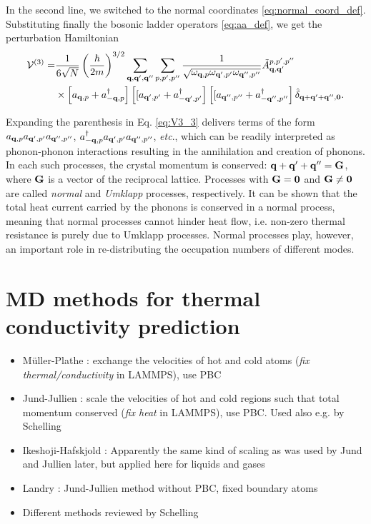 In the second line, we switched to the normal coordinates \eqref{eq:normal_coord_def}. Substituting finally the bosonic ladder operators \eqref{eq:aa_def}, we get the perturbation Hamiltonian
\begin{alignat}{2}
\mathcal{V}^{(3)} = & \frac{1}{6\sqrt{N}} \left(\frac{\hbar}{2m} \right)^{3/2} \sum_{\mathbf{q},\mathbf{q}',\mathbf{q}''} \sum_{p,p',p''} \frac{1}{\sqrt{\omega_{\mathbf{q},p}\omega_{\mathbf{q}',p'} \omega_{\mathbf{q}'',p''}}} \tilde{A}^{p,p',p''}_{\mathbf{q},\mathbf{q}'} \notag \\
  & \times \left[a_{\mathbf{q},p}+a_{-\mathbf{q},p}^{\dagger} \right] \left[[a_{\mathbf{q}',p'}+a_{-\mathbf{q}',p'}^{\dagger}\right] \left[[a_{\mathbf{q}'',p''}+a_{-\mathbf{q}'',p''}^{\dagger}\right] \hat \delta_{\mathbf{q}+\mathbf{q}'+\mathbf{q}'',\mathbf{0}}. \label{eq:V3_3}
\end{alignat}

Expanding the parenthesis in Eq. \eqref{eq:V3_3} delivers terms of the form $a_{\mathbf{q},p}a_{\mathbf{q}',p'}a_{\mathbf{q}'',p''}$, $a_{-\mathbf{q},p}^{\dagger} a_{\mathbf{q}',p'}a_{\mathbf{q}'',p''}$, \textit{etc}., which can be readily interpreted as phonon-phonon interactions resulting in the annihilation and creation of phonons. In each such processes, the crystal momentum is conserved: $\mathbf{q}+\mathbf{q}'+\mathbf{q}''=\mathbf{G}$, where $\mathbf{G}$ is a vector of the reciprocal lattice. Processes with $\mathbf{G}=\mathbf{0}$ and $\mathbf{G}\neq \mathbf{0}$ are called \textit{normal} and \textit{Umklapp} processes, respectively. It can be shown \cite{ziman} that the total heat current carried by the phonons is conserved in a normal process, meaning that normal processes cannot hinder heat flow, i.e. non-zero thermal resistance is purely due to Umklapp processes. Normal processes play, however, an important role in re-distributing the occupation numbers of different modes.

\chapter{MD methods for thermal conductivity prediction}

\begin{itemize}
 \item M\"uller-Plathe \cite{mullerplathe97}: exchange the velocities of hot and cold atoms (\textit{fix thermal/conductivity} in LAMMPS), use PBC
 \item Jund-Jullien \cite{jund99}: scale the velocities of hot and cold regions such that total momentum conserved (\textit{fix heat} in LAMMPS), use PBC. Used also e.g. by Schelling
 \item Ikeshoji-Hafskjold \cite{ikeshoji94}: Apparently the same kind of scaling as was used by Jund and Jullien later, but applied here for liquids and gases
 \item Landry \cite{landry08}: Jund-Jullien method without PBC, fixed boundary atoms
 \item Different methods reviewed by Schelling
\end{itemize}


